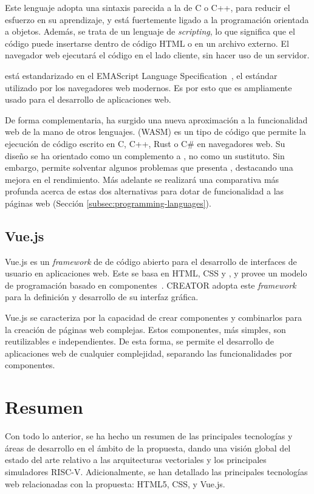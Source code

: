 Este lenguaje adopta una sintaxis parecida a la de C o C++, para reducir el esfuerzo en su aprendizaje, y está fuertemente ligado a la programación orientada a objetos. Además, se trata de un lenguaje de \textit{scripting}, lo que significa que el código puede insertarse dentro de código HTML o en un archivo externo. El navegador web ejecutará el código {\js} en el lado cliente, sin hacer uso de un servidor.

{\js} está estandarizado en el EMAScript Language Specification~\cite{ECMAScript}, el estándar utilizado por los navegadores web modernos. Es por esto que {\js} es ampliamente usado para el desarrollo de aplicaciones web.

De forma complementaria, ha surgido una nueva aproximación a la funcionalidad web de la mano de otros lenguajes. \wa (WASM) es un tipo de código que permite la ejecución de código escrito en C, C++, Rust o C\# en navegadores web. Su diseño se ha orientado como un complemento a \js, no como un sustituto. Sin embargo, \wa permite solventar algunos problemas que presenta {\js}, destacando una mejora en el rendimiento. Más adelante se realizará una comparativa más profunda acerca de estas dos alternativas para dotar de funcionalidad a las páginas web (Sección \ref{subsec:programming-languages}).

\subsection{Vue.js}
Vue.js es un \textit{framework} de {\js} de código abierto para el desarrollo de interfaces de usuario en aplicaciones web. Este se basa en HTML, CSS y {\js}, y provee un modelo de programación basado en componentes~\cite{vuejs}. CREATOR adopta este \textit{framework} para la definición y desarrollo de su interfaz gráfica.

Vue.js se caracteriza por la capacidad de crear componentes y combinarlos para la creación de páginas web complejas. Estos componentes, más simples, son reutilizables e independientes. De esta forma, se permite el desarrollo de aplicaciones web de cualquier complejidad, separando las funcionalidades por componentes.

\section{Resumen}

Con todo lo anterior, se ha hecho un resumen de las principales tecnologías y áreas de desarrollo en el ámbito de la propuesta, dando una visión global del estado del arte relativo a las arquitecturas vectoriales y los principales simuladores RISC-V. Adicionalmente, se han detallado las principales tecnologías web relacionadas con la propuesta: HTML5, CSS, {\js} y Vue.js\@.
